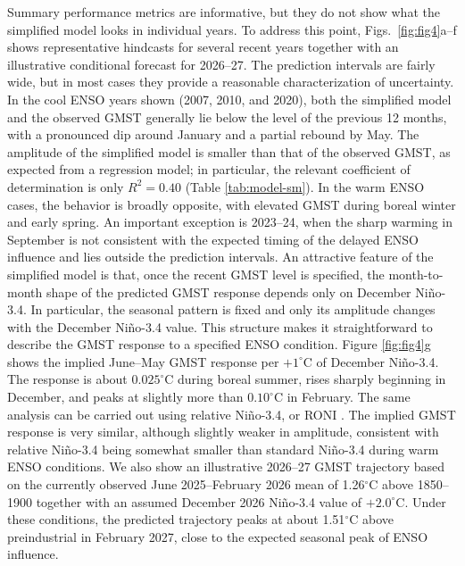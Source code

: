 \documentclass[draft]{agujournal2019}
\begin{document}
Summary performance metrics are informative, but they do not
  show what the simplified model looks in individual years.
  To address this point, Figs.\ \ref{fig:fig4}a--f shows
  representative hindcasts for several recent years together with
  an illustrative conditional forecast for 2026--27. The prediction intervals are fairly wide, but in most cases
  they provide a reasonable characterization of uncertainty. In the cool ENSO years shown (2007, 2010, and 2020), both
  the simplified model and the observed GMST generally lie below
  the level of the previous 12 months, with a pronounced dip
  around January and a partial rebound by May. The amplitude of
  the simplified model is smaller than that of the observed GMST,
  as expected from a regression model; in particular, the
  relevant coefficient of determination is only $R^2=0.40$
  (Table \ref{tab:model-sm}). In the warm ENSO cases, the behavior is broadly opposite,
  with elevated GMST during boreal winter and early spring.
  An important exception is 2023--24, when the sharp warming in
  September is not consistent with the expected timing of the
  delayed ENSO influence and lies outside the prediction
  intervals. An attractive feature of the simplified model is that, once
  the recent GMST level is specified, the month-to-month shape of
  the predicted GMST response depends only on December
  Niño-3.4. In particular, the seasonal pattern is fixed and only
  its amplitude changes with the December Niño-3.4 value. This structure makes it straightforward to describe the GMST
  response to a specified ENSO condition. Figure \ref{fig:fig4}g
  shows the implied June--May GMST response per
  $+1^\circ$C of December Niño-3.4. The response is about
  $0.025^\circ$C during boreal summer, rises sharply beginning in
  December, and peaks at slightly more than $0.10^\circ$C in
  February. The same analysis can be carried out using relative
  Niño-3.4, or RONI \cite{LHeureux2024relative}. The implied
  GMST response is very similar, although slightly weaker in
  amplitude, consistent with relative Niño-3.4 being somewhat
  smaller than standard Niño-3.4 during warm ENSO conditions. We also show an illustrative 2026--27 GMST trajectory based
  on the currently observed June 2025--February 2026 mean of
  1.26$^\circ$C above 1850--1900 together with an assumed
  December 2026 Niño-3.4 value of $+2.0^\circ$C. Under these conditions, the predicted trajectory peaks at
  about 1.51$^\circ$C above preindustrial in February 2027,
  close to the expected seasonal peak of ENSO influence.
\end{document}

